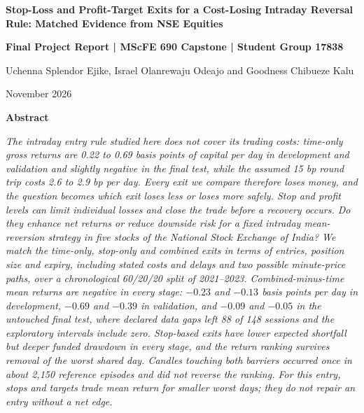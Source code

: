 \documentclass[11pt,a4paper]{article}
\begin{document}
\justifying


\begin{center}{\fontsize{14}{17}\selectfont\bfseries Stop-Loss and Profit-Target Exits for a Cost-Losing Intraday Reversal Rule: Matched Evidence from NSE Equities\par}\vspace{6pt}

\textbf{Final Project Report | MScFE 690 Capstone | Student Group 17838}\par\vspace{4pt}

Uchenna Splendor Ejike, Israel Olanrewaju Odeajo and Goodness Chibueze Kalu\par\vspace{4pt}

November 2026\par\vspace{4pt}

\end{center}

\begin{center}\bfseries Abstract\end{center}

{\itshape\noindent The intraday entry rule studied here does not cover its trading costs: time-only gross returns are 0.22 to 0.69 basis points of capital per day in development and validation and slightly negative in the final test, while the assumed 15 bp round trip costs 2.6 to 2.9 bp per day. Every exit we compare therefore loses money, and the question becomes which exit loses less or loses more safely. Stop and profit levels can limit individual losses and close the trade before a recovery occurs. Do they enhance net returns or reduce downside risk for a fixed intraday mean-reversion strategy in five stocks of the National Stock Exchange of India? We match the time-only, stop-only and combined exits in terms of entries, position size and expiry, including stated costs and delays and two possible minute-price paths, over a chronological 60/20/20 split of 2021--2023. Combined-minus-time mean returns are negative in every stage: $-0.23$ and $-0.13$ basis points per day in development, $-0.69$ and $-0.39$ in validation, and $-0.09$ and $-0.05$ in the untouched final test, where declared data gaps left 88 of 148 sessions and the exploratory intervals include zero. Stop-based exits have lower expected shortfall but deeper funded drawdown in every stage, and the return ranking survives removal of the worst shared day. Candles touching both barriers occurred once in about 2,150 reference episodes and did not reverse the ranking. For this entry, stops and targets trade mean return for smaller worst days; they do not repair an entry without a net edge.\par}
\end{document}
